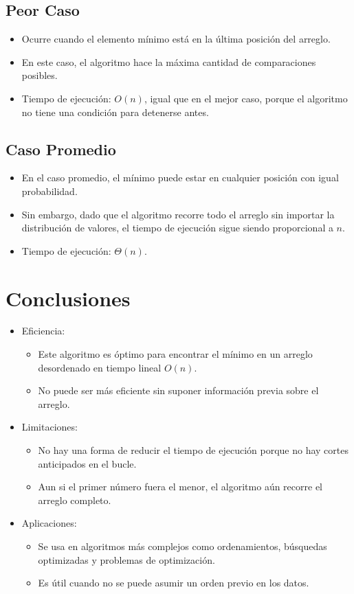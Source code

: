\documentclass{article}
\begin{document}
	\subsection*{Peor Caso}
	\begin{itemize}
		\item Ocurre cuando el elemento mínimo está en la última posición del arreglo.
		\item En este caso, el algoritmo hace la máxima cantidad de comparaciones posibles.
		\item Tiempo de ejecución: $ O(n) $, igual que en el mejor caso, porque el algoritmo no tiene una condición para detenerse antes.
	\end{itemize}
	
	\subsection*{Caso Promedio}
	\begin{itemize}
		\item En el caso promedio, el mínimo puede estar en cualquier posición con igual probabilidad.
		\item Sin embargo, dado que el algoritmo recorre todo el arreglo sin importar la distribución de valores, el tiempo de ejecución sigue siendo proporcional a $ n $.
		\item Tiempo de ejecución: $ \Theta(n) $.
	\end{itemize}
	
	\section{Conclusiones}
	
	\begin{itemize}
		\item Eficiencia:
		\begin{itemize}
			\item Este algoritmo es óptimo para encontrar el mínimo en un arreglo desordenado en tiempo lineal $ O(n) $.
			\item No puede ser más eficiente sin suponer información previa sobre el arreglo.
		\end{itemize}
		
		\item Limitaciones:
		\begin{itemize}
			\item No hay una forma de reducir el tiempo de ejecución porque no hay cortes anticipados en el bucle.
			\item Aun si el primer número fuera el menor, el algoritmo aún recorre el arreglo completo.
		\end{itemize}
		
		\item Aplicaciones:
		\begin{itemize}
			\item Se usa en algoritmos más complejos como ordenamientos, búsquedas optimizadas y problemas de optimización.
			\item Es útil cuando no se puede asumir un orden previo en los datos.
		\end{itemize}
	\end{itemize}
	
\end{document}
